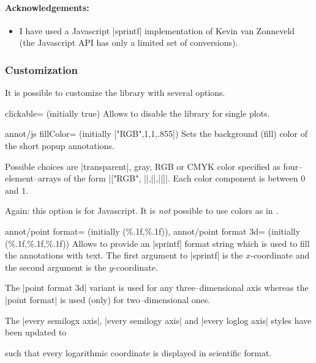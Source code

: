 	\paragraph{Acknowledgements:}
	\begin{itemize}
		\item I have used a Javascript |sprintf| implementation of Kevin van Zonneveld~\cite{phptojs} (the Javascript API has only a limited set of conversions).
	\end{itemize}


\subsubsection{Customization}
It is possible to customize the library with several options.

\begin{pgfplotskey}{clickable= (initially true)}
	Allows to disable the library for single plots.
\end{pgfplotskey}

\begin{pgfplotskey}{annot/js fillColor= (initially ["RGB",1,1,.855])}
	Sets the background (fill) color of the short popup annotations. 
	
	Possible choices are |transparent|, gray, RGB or CMYK color specified as four--element--arrays of the form
	|["RGB", ||,||,||]|. Each color component is between $0$ and $1$.

	Again: this option is for Javascript. It is \emph{not} possible to use colors as in \pgfname.
\end{pgfplotskey}

\begin{pgfplotskeylist}{%
	annot/point format= (initially {(\%.1f,\%.1f)}),
	annot/point format 3d= (initially {(\%.1f,\%.1f,\%.1f)})}
	Allows to provide an |sprintf| format string which is used to fill the annotations with text. 
	The first argument to |sprintf| is the $x$-coordinate and the second argument is the $y$-coordinate.

	The |point format 3d| variant is used for any three--dimensional axis whereas the |point format| is used (only) for two--dimensional ones.

	The |every semilogx axis|, |every semilogy axis| and |every loglog axis| styles have been updated to
\begin{codeexample}
\end{codeexample}
	\noindent such that every logarithmic coordinate is displayed in scientific format.
\end{pgfplotskeylist}


